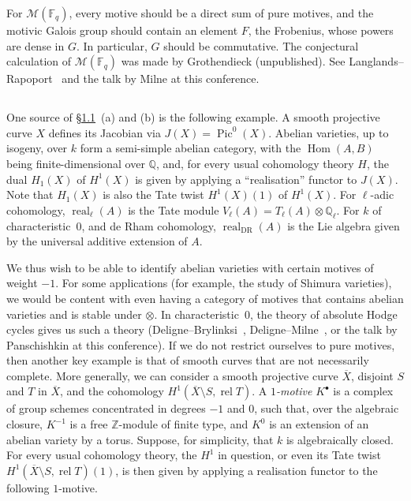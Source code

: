 \documentclass{article}
\theoremstyle{plain}
\theoremstyle{definition}
\newcommand{\scr}[1]{{\mathscr{#1}}}
\newcommand{\ZZ}{\mathbb{Z}}
\newcommand{\QQ}{\mathbb{Q}}
\newcommand{\FF}{\mathbb{F}}
\DeclareMathOperator{\Pic}{Pic}
\DeclareMathOperator{\Hom}{Hom}
\DeclareMathOperator{\real}{real}
\newcommand{\oldpage}[1]{\marginpar{\footnotesize$\Big\vert$ \textit{p.~#1}}}
\begin{document}
For $\scr{M}(\FF_q)$, every motive should be a direct sum of pure motives, and the motivic Galois group should contain an element $F$, the Frobenius, whose powers are dense in $G$.
In particular, $G$ should be commutative.
The conjectural calculation of $\scr{M}(\FF_q)$ was made by Grothendieck (unpublished).
See Langlands--Rapoport~\cite{23} and the talk by Milne at this conference.


\subsection{}
\label{1.5}

One source of \hyperref[1.1]{\S1.1}~(a) and (b) is the following example.
A smooth projective curve $X$ defines its Jacobian via $J(X)=\Pic^0(X)$.
Abelian varieties, up to isogeny, over $k$ form a semi-simple abelian category, with the $\Hom(A,B)$ being finite-dimensional over $\QQ$, and, for every usual cohomology theory $H$, the dual $H_1(X)$ of $H^1(X)$ is given by applying a ``realisation'' functor to $J(X)$.
Note that $H_1(X)$ is also the Tate twist $H^1(X)(1)$ of $H^1(X)$.
For $\ell$-adic cohomology, $\real_\ell(A)$ is the Tate module $V_\ell(A)=T_\ell(A)\otimes\QQ_\ell$.
For $k$ of characteristic~$0$, and
\oldpage{148}
de Rham cohomology, $\real_{\mathrm{DR}}(A)$ is the Lie algebra given by the universal additive extension of $A$.

We thus wish to be able to identify abelian varieties with certain motives of weight $-1$.
For some applications (for example, the study of Shimura varieties), we would be content with even having a category of motives that contains abelian varieties and is stable under $\otimes$.
In characteristic~$0$, the theory of absolute Hodge cycles gives us such a theory (Deligne--Brylinksi~\cite{11}, Deligne--Milne~\cite{12}, or the talk by Panschishkin at this conference).
If we do not restrict ourselves to pure motives, then another key example is that of smooth curves that are not necessarily complete.
More generally, we can consider a smooth projective curve $\overline{X}$, disjoint $S$ and $T$ in $\overline{X}$, and the cohomology $H^1(\overline{X}\setminus S,\operatorname{rel}T)$.
A \emph{$1$-motive} $K^\bullet$ is a complex of group schemes concentrated in degrees $-1$ and $0$, such that, over the algebraic closure, $K^{-1}$ is a free $\ZZ$-module of finite type, and $K^0$ is an extension of an abelian variety by a torus.
Suppose, for simplicity, that $k$ is algebraically closed.
For every usual cohomology theory, the $H^1$ in question, or even its Tate twist $H^1(\overline{X}\setminus S,\operatorname{rel}T)(1)$, is then given by applying a realisation functor to the following $1$-motive.
\end{document}
